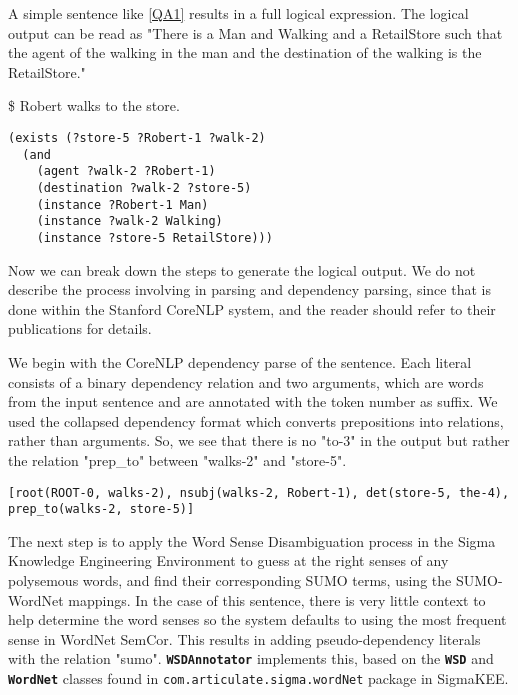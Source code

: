 \documentclass{book}
\newcommand{\tsumo}[1]{{\small \textbf{\texttt{#1}}}}
\begin{document}
A simple sentence like \ref{QA1} results in a full logical expression.  The logical
output can be read as "There is a Man and Walking and a RetailStore such that the
agent of the walking in the man and the destination of the walking is the RetailStore."

\begin{exe}	
\ex \label{QA1}
\$ Robert walks to the store.
\begin{verbatim}
(exists (?store-5 ?Robert-1 ?walk-2) 
  (and 
    (agent ?walk-2 ?Robert-1)
    (destination ?walk-2 ?store-5)
    (instance ?Robert-1 Man)
    (instance ?walk-2 Walking)
    (instance ?store-5 RetailStore))) 
\end{verbatim}
\end{exe}

Now we can break down the steps to generate the logical output.  We do not describe
the process involving in parsing and dependency parsing, since that is done within
the Stanford CoreNLP system, and the reader should refer to their publications for
details.

We begin with the CoreNLP dependency parse of the sentence.  Each literal 
consists of a binary dependency relation and two arguments, which are words
from the input sentence and are annotated with the token number as suffix.
We used the collapsed dependency format which converts prepositions into 
relations, rather than arguments.  So, we see that there is no "to-3" in the output
but rather the relation "prep\_to" between "walks-2" and "store-5".

\begin{verbatim}
[root(ROOT-0, walks-2), nsubj(walks-2, Robert-1), det(store-5, the-4), 
prep_to(walks-2, store-5)]
\end{verbatim}

The next step is to apply the Word Sense Disambiguation process in the Sigma
Knowledge Engineering Environment to guess at the right senses of any polysemous
words, and find their corresponding SUMO terms, using the SUMO-WordNet mappings.
In the case of this sentence, there is very little context to help determine the
word senses so the system defaults to using the most frequent sense in WordNet
SemCor.  This results in adding pseudo-dependency literals with the relation
"sumo". \tsumo{WSDAnnotator} implements this, based
on the \tsumo{WSD} and
\tsumo{WordNet} classes found in
\texttt{com.articulate.sigma.wordNet} package in SigmaKEE.
\end{document}
